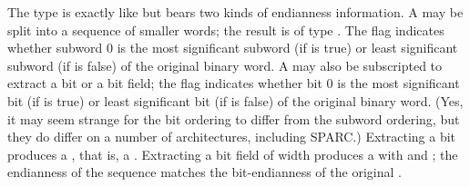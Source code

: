 The type  is exactly
like  but bears two kinds of endianness information.  A
 may be split into a sequence of smaller words; the result is of
type .  The flag  indicates whether
subword 0 is the most significant subword (if  is true) or least
significant subword (if  is false) of the original binary word.  A
 may also be subscripted to extract a bit or a bit field; the
flag  indicates whether bit 0 is the most significant bit (if
 is true) or least significant bit (if  is false) of
the original binary word.  (Yes, it may seem strange for the bit ordering to differ
from the subword ordering, but they do differ on a number of architectures, including SPARC.)
Extracting a bit produces a , that is, a .
Extracting a bit field of width  produces a
 with  and ; the endianness of
the sequence matches the bit-endianness of the original .


